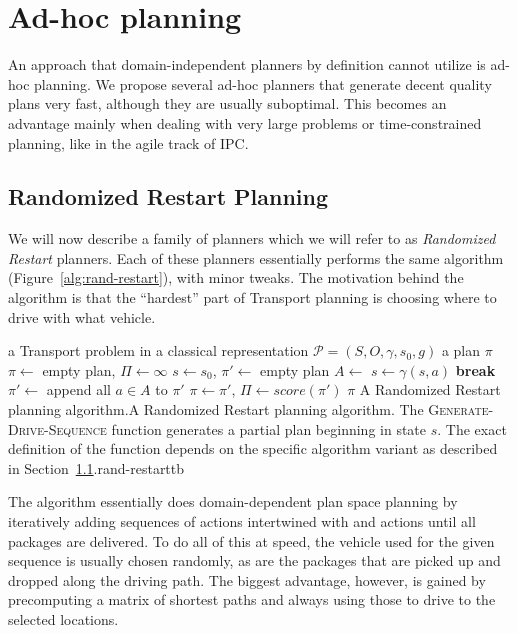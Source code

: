 \section{Ad-hoc planning}\label{ad-hoc}

An approach that domain-independent planners by definition cannot utilize
is ad-hoc planning. We propose several
ad-hoc planners that generate decent quality plans very fast,
although they are usually suboptimal.
This becomes an advantage mainly when dealing with very large
problems or time-constrained planning,
like in the agile track of IPC.

\subsection{Randomized Restart Planning}\label{rand-restart}

We will now describe a family of planners which we will refer to as \textit{Randomized Restart} planners.
Each of these planners essentially performs the same algorithm (Figure~\ref{alg:rand-restart}),
with minor tweaks. The motivation
behind the algorithm is that the ``hardest'' part of Transport planning
is choosing where to drive with what vehicle.

%
{%
\Input a Transport problem in a classical representation $\mathcal{P} = (S, O, \gamma, s_0, g)$
\Output a plan $\pi$
\State $\pi \gets $ empty plan, $\Pi \gets \infty$
 
\State $s \gets s_0$, $\pi' \gets $ empty plan
\State $A \gets $ 
 
\State $s \gets \gamma(s, a)$
\EndFor
{} \textbf{break} 
\EndIf
\State $\pi' \gets $ append all $a \in A$ to $\pi'$
\EndWhile
{}
\State $\pi \gets \pi'$, $\Pi \gets score(\pi')$ 
\EndIf
\EndWhile
\State \Return $\pi$
\EndFunction
}%
{A Randomized Restart planning algorithm.}{A Randomized Restart planning algorithm. The \textsc{Generate-Drive-Sequence} function
generates a partial plan beginning in state $s$.
The exact definition of the function
depends on the specific algorithm variant as described in Section~\ref{rand-restart}.}{rand-restart}{tb}

The algorithm essentially does domain-dependent plan space planning
by iteratively adding sequences of \drive{} actions
intertwined with \pickup{} and \drop{} actions
until all packages are delivered.
To do all of this at speed, the vehicle used for the given sequence
is usually chosen randomly, as are the packages that are picked up and dropped along the driving path.
The biggest advantage, however, is gained by precomputing
a matrix of shortest paths and always using those to drive to the
selected locations.

